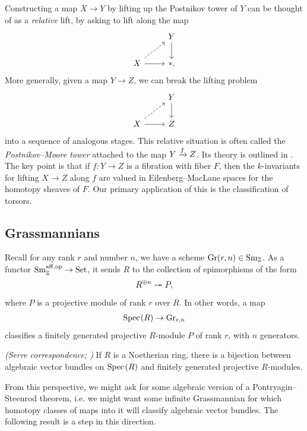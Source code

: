 \documentclass[11pt,openany]{book}
\providecommand{\aff}{\mathrm{aff}}
\begin{document}
\begin{remark} Constructing a map $X \to Y$ by lifting up the Postnikov tower of $Y$ can be thought of as a \textit{relative} lift, by asking to lift along the map
\[\begin{tikzcd}
     & Y\dar\\
    X\rar\ar[ur,dashed] & \ast.
\end{tikzcd} \]
More generally, given a map $Y \to Z$, we can break the lifting problem
\[ \begin{tikzcd}
     & Y\dar\\
    X\rar\ar[ur,dashed] & Z
\end{tikzcd} \]
into a sequence of analogous stages. This relative situation is often called the \textit{Postnikov--Moore tower} attached to the map $Y \xrightarrow{f} Z$. Its theory is outlined in \cite[\S B]{Morel}. The key point is that if $f\colon Y \to Z$ is a fibration with fiber $F$, then the $k$-invariants for lifting $X \to Z$ along $f$ are valued in Eilenberg--MacLane spaces for the homotopy sheaves of $F$. Our primary application of this is the classification of torsors.


\end{remark}



\subsection{Grassmannians}

Recall for any rank $r$ and number $n$, we have a scheme $\mathrm{Gr}(r,n) \in \mathrm{Sm}_{\mathbb{Z}}$. As a functor $\Sm_\Z^{\aff,\op} \to \Set$, it sends $R$ to the collection of epimorphisms of the form
\begin{align*}
    R^{\oplus n} \twoheadrightarrow P,
\end{align*}
where $P$ is a projective module of rank $r$ over $R$. In other words, a map
\begin{align*}
    \text{Spec}\hspace{0.1em}(R) \to \mathrm{Gr}_{r,n}
\end{align*}
classifies a finitely generated projective $R$-module $P$ of rank $r$, with $n$ generators.

\begin{theorem} \textit{(Serre correspondence; \cite[II\S4]{FAC})} If $R$ is a Noetherian ring, there is a bijection between algebraic vector bundles on $\text{Spec}\hspace{0.1em}(R)$ and finitely generated projective $R$-modules.
\end{theorem}

From this perspective, we might ask for some algebraic version of a Pontryagin--Steenrod theorem, i.e. we might want some infinite Grassmannian for which homotopy classes of maps into it will classify algebraic vector bundles. The following result is a step in this direction.
\end{document}
